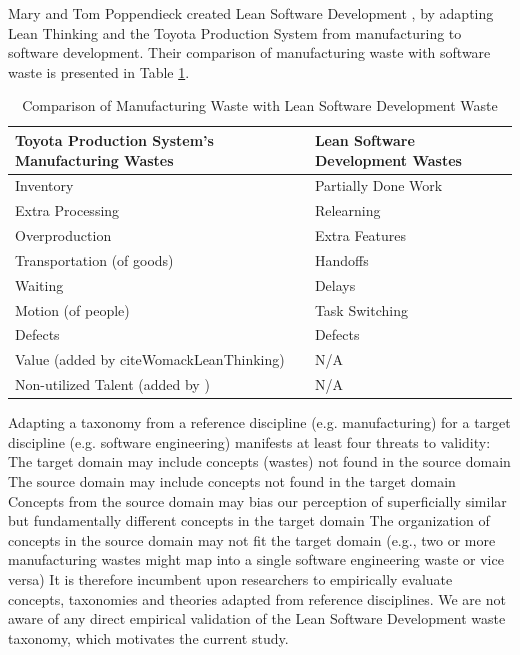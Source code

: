 Mary and Tom Poppendieck created Lean Software Development \cite{PoppendieckLeanSoftwareDevelopment}, by adapting Lean Thinking and the Toyota Production System from manufacturing to software development. Their comparison of manufacturing waste with software waste is presented in Table \ref{ManufacturingVersusLeanSoftwareWaste}.

\begin{table}[t]
\renewcommand{\arraystretch}{1.5}
\centering
\caption{Comparison of Manufacturing Waste with Lean Software Development Waste}
\label{ManufacturingVersusLeanSoftwareWaste}
\begin{tabular}{|p{1.57in}|p{1.57in}|}
\hline
Toyota Production System's Manufacturing Wastes & Lean Software Development Wastes \cite{PoppendieckConceptToCash} \\ \hline
Inventory                                       & Partially Done Work                       \\ \hline
Extra Processing                                & Relearning                                \\ \hline
Overproduction                                  & Extra Features                            \\ \hline
Transportation (of goods)                       & Handoffs                                  \\ \hline
Waiting                                         & Delays                                    \\ \hline
Motion (of people)                              & Task Switching                            \\ \hline
Defects                                         & Defects                                   \\ \hline
Value (added by cite{WomackLeanThinking})                 & N/A                                       \\ \hline
Non-utilized Talent (added by \cite{ LikerToyotaWay})     & N/A                                       \\ \hline
\end{tabular}
\end{table}

Adapting a taxonomy from a reference discipline (e.g. manufacturing) for a target discipline (e.g. software engineering) manifests at least four threats to validity: 
The target domain may include concepts (wastes) not found in the source domain 
The source domain may include concepts not found in the target domain
Concepts from the source domain may bias our perception of superficially similar but fundamentally different concepts in the target domain
The organization of concepts in the source domain may not fit the target domain (e.g., two or more manufacturing wastes might map into a single software engineering waste or vice versa) 
It is therefore incumbent upon researchers to empirically evaluate concepts, taxonomies and theories adapted from reference disciplines. We are not aware of any direct empirical validation of the Lean Software Development waste taxonomy, which motivates the current study. 

